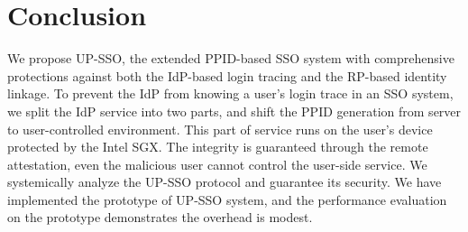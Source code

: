 \section{Conclusion}
\label{sec:conclusion}
We propose UP-SSO,
the extended PPID-based SSO system with comprehensive protections against both the IdP-based login tracing and the RP-based identity linkage.
To prevent the IdP from knowing a user's login trace in an SSO system, we split the IdP service into two parts, and shift the PPID generation from server to user-controlled environment.
This part of service runs on the user's device protected by the Intel SGX. The integrity is guaranteed through the remote attestation, even the malicious user cannot control the user-side service.
We systemically analyze the UP-SSO protocol and guarantee its security.
We have implemented the prototype of UP-SSO system, and the performance evaluation on the prototype demonstrates the  overhead is modest.
